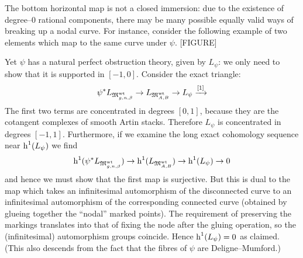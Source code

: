 \begin{remark}
The bottom horizontal map is not a closed immersion: due to the existence of degree--$0$ rational components, there may be many possible equally valid ways of breaking up a nodal curve. For instance, consider the following example of two elements which map to the same curve under $\psi$.
[FIGURE]

Yet $\psi$ has a natural perfect obstruction theory, given by $L_{\psi}$: we only need to show that it is supported in $[-1,0]$. Consider the exact triangle:
\begin{equation*} \psi^* L_{\mathfrak M_{g,n,\beta}^{\operatorname{wt}}} \rightarrow L_{\mathfrak M_{A,B}^{\operatorname{wt}}} \rightarrow L_\psi \xrightarrow{[1]} \end{equation*}
The first two terms are concentrated in degrees $[0,1]$, because they are the cotangent complexes of smooth Artin stacks. Therefore $L_\psi$ is concentrated in degrees $[-1,1]$. Furthermore, if we examine the long exact cohomology sequence near $\operatorname{h}^1(L_\psi)$ we find
\begin{equation*} \operatorname{h}^1(\psi^* L_{\mathfrak M_{g,n,\beta}^{\operatorname{wt}}}) \rightarrow \operatorname{h}^1(L_{\mathfrak M_{A,B}^{\operatorname{wt}}}) \rightarrow \operatorname{h}^1(L_\psi) \rightarrow 0 \end{equation*}
and hence we must show that the first map is surjective. But this is dual to the map which takes an infinitesimal automorphism of the disconnected curve to an infinitesimal automorphism of the corresponding connected curve (obtained by glueing together the ``nodal'' marked points). The requirement of preserving the markings translates into that of fixing the node after the gluing operation, so the (infinitesimal) automorphism groups coincide. Hence $\operatorname{h}^1(L_\psi) = 0$ as claimed. (This also descends from the fact that the fibres of $\psi$ are Deligne--Mumford.)
\end{remark}

